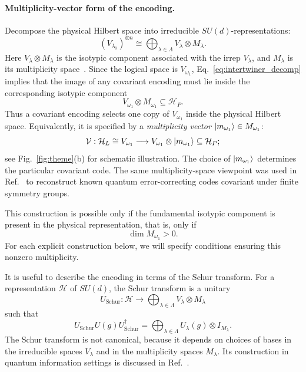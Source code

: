 \documentclass[10pt,twocolumn,superscriptaddress,aps,amsmath,amssymb,citeautoscript,floatfix,prx]{revtex4-2}
\theoremstyle{plain}
\theoremstyle{plain}
\theoremstyle{plain}
\theoremstyle{plain}
\theoremstyle{plain}
\theoremstyle{plain}
\theoremstyle{plain}
\theoremstyle{definition}
\theoremstyle{plain}
\begin{document}
\paragraph{Multiplicity-vector form of the encoding.}

Decompose the physical Hilbert space into irreducible $SU(d)$-representations:
\begin{equation}\label{eq:isotipic_decomp}
(V_{\lambda_0})^{\otimes n}
\cong
\bigoplus_{\lambda\in\Lambda}
V_\lambda\otimes M_\lambda .
\end{equation}
Here $V_\lambda\otimes M_\lambda$ is the isotypic component associated with the irrep $V_\lambda$, and $M_\lambda$ is its multiplicity space~\cite{Kong2022}. Since the logical space is $V_{\omega_1}$, Eq.~\eqref{eq:intertwiner_decomp} implies that the image of any covariant encoding must lie inside the corresponding isotypic component
$$
V_{\omega_1}\otimes M_{\omega_1}
\subseteq
\mathcal H_P .
$$
Thus a covariant encoding selects one copy of $V_{\omega_1}$ inside the physical Hilbert space. Equivalently, it is specified by a \textit{multiplicity vector} $\ket{m_{\omega_1}}\in M_{\omega_1}$:
\begin{equation}\label{eq:mult_vec_enc}
\mathcal{V}:
\mathcal H_L
\cong
V_{\omega_1}
\longrightarrow
V_{\omega_1}\otimes\ket{m_{\omega_1}}
\subseteq
\mathcal H_P;
\end{equation}
see Fig.~\ref{fig:theme}(b) for schematic illustration. The choice of $\ket{m_{\omega_1}}$ determines the particular covariant code. 
The same multiplicity-space viewpoint was used in Ref.~\cite{Denys2024} to reconstruct known quantum error-correcting codes covariant under 
finite symmetry groups.

This construction is possible only if the fundamental isotypic component is present in the physical representation, that is, only if
$$
\dim M_{\omega_1}>0 .
$$
For each explicit construction below, we will specify conditions ensuring this nonzero multiplicity.

It is useful to describe the encoding in terms of the Schur transform. For a representation $\mathcal H$ of $SU(d)$, 
the Schur transform is a unitary
$$
U_{\mathrm{Schur}}:
\mathcal H
\longrightarrow
\bigoplus_{\lambda\in\Lambda}
V_\lambda\otimes M_\lambda
$$
such that
\begin{equation}\label{eq:schur_transform}
U_{\mathrm{Schur}}
U(g)
U_{\mathrm{Schur}}^\dagger
=
\bigoplus_{\lambda\in\Lambda}
U_\lambda(g)\otimes I_{M_\lambda}.
\end{equation}
The Schur transform is not canonical, because it depends on choices of bases in the irreducible spaces $V_\lambda$ and in 
the multiplicity spaces $M_\lambda$. Its construction in quantum information settings is discussed in Ref.~\cite{Bacon2006}.
\end{document}
